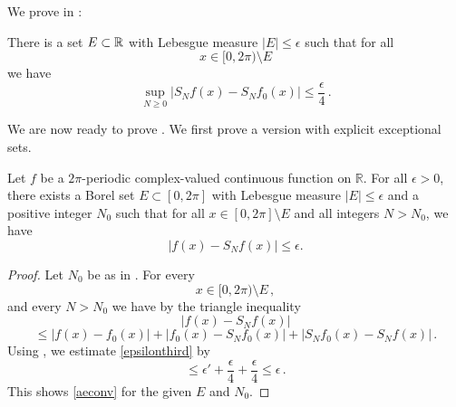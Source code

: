 We prove in :
\begin{lemma}
\label{control-approximation-effect}
\leanok
{}
    There is a set $E \subset {\mathbb{R}}$ with Lebesgue measure
    $|E|\le \epsilon$ such that for all
    \begin{equation}
        x\in [0,2\pi)\setminus E
    \end{equation}
   we have
   \begin{equation}
    \label{eq-max-partial-sum-diff}
    \sup_{N\ge 0} |S_Nf(x)-S_Nf_0(x)| \le \frac \epsilon 4\,.
    \end{equation}
\end{lemma}

We are now ready to prove . We first prove a version with explicit exceptional sets.

\begin{theorem}
    \label{exceptional-set-carleson}
    \leanok
    Let $f$ be a $2\pi$-periodic complex-valued continuous function on $\mathbb{R}$. For all $\epsilon>0$, there exists a Borel set $E\subset [0,2\pi]$ with Lebesgue measure $|E|\le \epsilon$ and a positive integer $N_0$ such that for all $x\in [0,2\pi]\setminus E$ and all integers $N>N_0$, we have
    \begin{equation}\label{aeconv}
    |f(x)-S_N f(x)|\le \epsilon.
    \end{equation}
\end{theorem}
\begin{proof}
\leanok
Let $N_0$ be as in .
For every
\begin{equation}
x\in [0, 2\pi) \setminus E\, ,
\end{equation}
and every $N>N_0$ we have by the triangle inequality
\begin{equation*}
    |f(x)-S_Nf(x)|
    \end{equation*}
    \begin{equation}\label{epsilonthird}
    \le |f(x)-f_0(x)|+ |f_0(x)-S_Nf_0(x)|+|S_Nf_0(x)-S_N f(x)|\, .
\end{equation}
Using , we estimate \eqref{epsilonthird} by
\begin{equation}
    \le \epsilon' +\frac \epsilon 4 +\frac \epsilon 4\le \epsilon\, .
\end{equation}
This shows \eqref{aeconv} for the given $E$ and $N_0$.
\end{proof}


